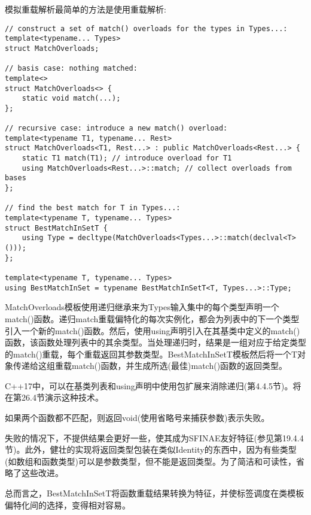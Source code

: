 模拟重载解析最简单的方法是使用重载解析:

\begin{lstlisting}[style=styleCXX]
// construct a set of match() overloads for the types in Types...:
template<typename... Types>
struct MatchOverloads;

// basis case: nothing matched:
template<>
struct MatchOverloads<> {
	static void match(...);
};

// recursive case: introduce a new match() overload:
template<typename T1, typename... Rest>
struct MatchOverloads<T1, Rest...> : public MatchOverloads<Rest...> {
	static T1 match(T1); // introduce overload for T1
	using MatchOverloads<Rest...>::match; // collect overloads from bases
};

// find the best match for T in Types...:
template<typename T, typename... Types>
struct BestMatchInSetT {
	using Type = decltype(MatchOverloads<Types...>::match(declval<T>()));
};

template<typename T, typename... Types>
using BestMatchInSet = typename BestMatchInSetT<T, Types...>::Type;
\end{lstlisting}

MatchOverloads模板使用递归继承来为Types输入集中的每个类型声明一个match()函数。递归match重载偏特化的每次实例化，都会为列表中的下一个类型引入一个新的match()函数。然后，使用using声明引入在其基类中定义的match()函数，该函数处理列表中的其余类型。当处理递归时，结果是一组对应于给定类型的match()重载，每个重载返回其参数类型。BestMatchInSetT模板然后将一个T对象传递给这组重载match()函数，并生成所选(最佳)match()函数的返回类型。

\begin{tcolorbox}[colback=webgreen!5!white,colframe=webgreen!75!black]
\hspace*{0.75cm}C++17中，可以在基类列表和using声明中使用包扩展来消除递归(第4.4.5节)。将在第26.4节演示这种技术。
\end{tcolorbox}

如果两个函数都不匹配，则返回void(使用省略号来捕获参数)表示失败。

\begin{tcolorbox}[colback=webgreen!5!white,colframe=webgreen!75!black]
\hspace*{0.75cm}失败的情况下，不提供结果会更好一些，使其成为SFINAE友好特征(参见第19.4.4节)。此外，健壮的实现将返回类型包装在类似Identity的东西中，因为有些类型(如数组和函数类型)可以是参数类型，但不能是返回类型。为了简洁和可读性，省略了这些改进。
\end{tcolorbox}

总而言之，BestMatchInSetT将函数重载结果转换为特征，并使标签调度在类模板偏特化间的选择，变得相对容易。










